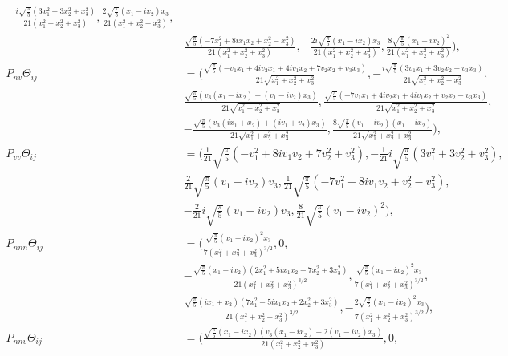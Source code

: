 \documentclass[prd,aps,a4paper,superscriptaddress,twocolumn,footinbib,showpacs]{revtex4}
\begin{document}
\begin{widetext}
\begin{align}
-\frac{i \sqrt{\frac{\pi }{5}} \left(3 x_1^2+3 x_2^2+x_3^2\right)}{21 \left(x_1^2+x_2^2+x_3^2\right)},\frac{2 \sqrt{\frac{\pi }{5}} (x_1-i x_2) x_3}{21 \left(x_1^2+x_2^2+x_3^2\right)},\nonumber\\
&\frac{\sqrt{\frac{\pi }{5}} \left(-7 x_1^2+8 i x_1 x_2+x_2^2-x_3^2\right)}{21 \left(x_1^2+x_2^2+x_3^2\right)},-\frac{2 i \sqrt{\frac{\pi }{5}} (x_1-i x_2) x_3}{21 \left(x_1^2+x_2^2+x_3^2\right)},\frac{8 \sqrt{\frac{\pi }{5}} (x_1-i x_2)^2}{21 \left(x_1^2+x_2^2+x_3^2\right)}),\\
P_{nv}\Theta_{ij}&=(\frac{\sqrt{\frac{\pi }{5}} (-v_1 x_1+4 i v_2 x_1+4 i v_1 x_2+7 v_2 x_2+v_3 x_3)}{21 \sqrt{x_1^2+x_2^2+x_3^2}},-\frac{i \sqrt{\frac{\pi }{5}} (3 v_1 x_1+3 v_2 x_2+v_3 x_3)}{21 \sqrt{x_1^2+x_2^2+x_3^2}},\nonumber\\
&\frac{\sqrt{\frac{\pi }{5}} (v_3 (x_1-i x_2)+(v_1-i v_2) x_3)}{21 \sqrt{x_1^2+x_2^2+x_3^2}},\frac{\sqrt{\frac{\pi }{5}} (-7 v_1 x_1+4 i v_2 x_1+4 i v_1 x_2+v_2 x_2-v_3 x_3)}{21 \sqrt{x_1^2+x_2^2+x_3^2}},\nonumber\\
&-\frac{\sqrt{\frac{\pi }{5}} (v_3 (i x_1+x_2)+(i v_1+v_2) x_3)}{21 \sqrt{x_1^2+x_2^2+x_3^2}},\frac{8 \sqrt{\frac{\pi }{5}} (v_1-i v_2) (x_1-i x_2)}{21 \sqrt{x_1^2+x_2^2+x_3^2}}),\\
P_{vv}\Theta_{ij}&=(\frac{1}{21} \sqrt{\frac{\pi }{5}} \left(-v_1^2+8 i v_1 v_2+7 v_2^2+v_3^2\right),-\frac{1}{21} i \sqrt{\frac{\pi }{5}} \left(3 v_1^2+3 v_2^2+v_3^2\right),\nonumber\\
&\frac{2}{21} \sqrt{\frac{\pi }{5}} (v_1-i v_2) v_3,\frac{1}{21} \sqrt{\frac{\pi }{5}} \left(-7 v_1^2+8 i v_1 v_2+v_2^2-v_3^2\right),\nonumber\\
&-\frac{2}{21} i \sqrt{\frac{\pi }{5}} (v_1-i v_2) v_3,\frac{8}{21} \sqrt{\frac{\pi }{5}} (v_1-i v_2)^2),\\
P_{nnn}\Theta_{ij}&=(\frac{\sqrt{\frac{\pi }{5}} (x_1-i x_2)^2 x_3}{7 \left(x_1^2+x_2^2+x_3^2\right)^{3/2}},0,\nonumber\\
&-\frac{\sqrt{\frac{\pi }{5}} (x_1-i x_2) \left(2 x_1^2+5 i x_1 x_2+7 x_2^2+3 x_3^2\right)}{21 \left(x_1^2+x_2^2+x_3^2\right)^{3/2}},\frac{\sqrt{\frac{\pi }{5}} (x_1-i x_2)^2 x_3}{7 \left(x_1^2+x_2^2+x_3^2\right)^{3/2}},\nonumber\\
&\frac{\sqrt{\frac{\pi }{5}} (i x_1+x_2) \left(7 x_1^2-5 i x_1 x_2+2 x_2^2+3 x_3^2\right)}{21 \left(x_1^2+x_2^2+x_3^2\right)^{3/2}},-\frac{2 \sqrt{\frac{\pi }{5}} (x_1-i x_2)^2 x_3}{7 \left(x_1^2+x_2^2+x_3^2\right)^{3/2}}),\\
P_{nnv}\Theta_{ij}&=(\frac{\sqrt{\frac{\pi }{5}} (x_1-i x_2) (v_3 (x_1-i x_2)+2 (v_1-i v_2) x_3)}{21 \left(x_1^2+x_2^2+x_3^2\right)},0,\nonumber\\

\end{align}
\end{widetext}
\end{document}
